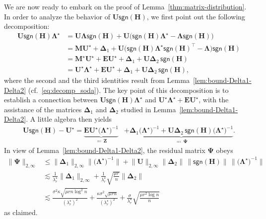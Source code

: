 We are now ready to embark on the proof of Lemma~\ref{thm:matrix-distribution}. 
In order to analyze the behavior of $\bm{U}\mathsf{sgn}(\bm{H})$, 
we first point out the following decomposition: 
%
\begin{align*}
\bm{U}\mathsf{sgn}(\bm{H})\bm{\Lambda}^{\star} & =\bm{U}\bm{\Lambda}\mathsf{sgn}(\bm{H})+\bm{U}\big(\mathsf{sgn}(\bm{H})\bm{\Lambda}^{\star}-\bm{\Lambda}\mathsf{sgn}(\bm{H})\big)\\
 & =\bm{M}\bm{U}^{\star}+\bm{\Delta}_{1}+\bm{U}\big(\mathsf{sgn}(\bm{H})\bm{\Lambda}^{\star}\mathsf{sgn}(\bm{H})^{\top}-\bm{\Lambda}\big)\mathsf{sgn}(\bm{H})\\
 & =\bm{M}^{\star}\bm{U}^{\star}+\bm{E}\bm{U}^{\star}+\bm{\Delta}_{1}+\bm{U}\bm{\Delta}_{2} \, \mathsf{sgn}(\bm{H})\\
 & =\bm{U}^{\star}\bm{\Lambda}^{\star}+\bm{E}\bm{U}^{\star}+\bm{\Delta}_{1}+\bm{U}\bm{\Delta}_{2}\, \mathsf{sgn}(\bm{H}),
\end{align*}
%
where the second and the third identities result from Lemma~\ref{lem:bound-Delta1-Delta2} (cf.~\eqref{eq:decomp_soda}). 
The key point of this decomposition is to establish a connection between $\bm{U}\mathsf{sgn}(\bm{H})\bm{\Lambda}^{\star}$ and $\bm{U}^{\star}\bm{\Lambda}^{\star} + \bm{E}\bm{U}^{\star}$, with the assistance of the matrices $\bm{\Delta}_1$ and $\bm{\Delta}_2$ studied in Lemma~\ref{lem:bound-Delta1-Delta2}. 
A little algebra then yields
%
\begin{align}
\bm{U}\mathsf{sgn}(\bm{H})-\bm{U}^{\star}=\underset{\eqqcolon\,\bm{Z}}{\underbrace{\bm{E}\bm{U}^{\star}\big(\bm{\Lambda}^{\star}\big)^{-1}}} & +\underset{\eqqcolon\,\bm{\Psi}}{\underbrace{\bm{\Delta}_{1}\big(\bm{\Lambda}^{\star}\big)^{-1}+\bm{U}\bm{\Delta}_{2}\,\mathsf{sgn}(\bm{H})\big(\bm{\Lambda}^{\star}\big)^{-1}}}.
\label{eq:U-Ustar-decomposition-Z-Psi}
\end{align}
%
In view of Lemma~\ref{lem:bound-Delta1-Delta2}, the residual matrix
$\bm{\Psi}$ obeys
%
\begin{align}
\|\bm{\Psi}\|_{2,\infty} & \leq\big\|\bm{\Delta}_{1}\big\|_{2,\infty}\big\|\big(\bm{\Lambda}^{\star}\big)^{-1}\big\|+\big\|\bm{U}\big\|_{2,\infty}\big\|\bm{\Delta}_{2}\big\|\,\big\|\mathsf{sgn}(\bm{H})\big\|\,\big\|\big(\bm{\Lambda}^{\star}\big)^{-1}\big\|\nonumber \\
 & \lesssim\frac{1}{\lambda_{r}^{\star}}\big\|\bm{\Delta}_{1}\big\|_{2,\infty}+\frac{1}{\lambda_{r}^{\star}}\sqrt{\frac{\mu r}{n}}\big\|\bm{\Delta}_{2}\big\|\nonumber \\
 & \lesssim\frac{\sigma^{2}\kappa\sqrt{\mu rn\log^{2}n}}{(\lambda_{r}^{\star})^{2}}+\frac{\kappa\sigma^{2}\sqrt{\mu rn}}{(\lambda_{r}^{\star})^{2}}+\frac{\sigma}{\lambda_{r}^{\star}}\sqrt{\frac{\mu r^{2}\log n}{n}}
\label{eq:Psi-two-inf-norm-bound}
\end{align}
%
as claimed. 



